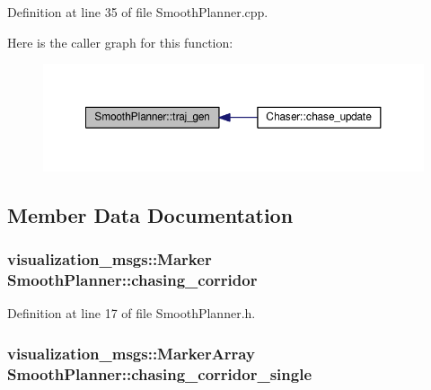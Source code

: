 Definition at line 35 of file Smooth\+Planner.\+cpp.



Here is the caller graph for this function\+:
\nopagebreak
\begin{figure}[H]
\begin{center}
\leavevmode
\includegraphics[width=350pt]{class_smooth_planner_afc03abbd5f6473f2bc952f70195326ac_icgraph}
\end{center}
\end{figure}




\subsection{Member Data Documentation}
\subsubsection[{\texorpdfstring{chasing\+\_\+corridor}{chasing_corridor}}]{\setlength{\rightskip}{0pt plus 5cm}visualization\+\_\+msgs\+::\+Marker Smooth\+Planner\+::chasing\+\_\+corridor}\hypertarget{class_smooth_planner_addf7aab458c1407f23e3544bd76ac82b}{}\label{class_smooth_planner_addf7aab458c1407f23e3544bd76ac82b}


Definition at line 17 of file Smooth\+Planner.\+h.

\subsubsection[{\texorpdfstring{chasing\+\_\+corridor\+\_\+single}{chasing_corridor_single}}]{\setlength{\rightskip}{0pt plus 5cm}visualization\+\_\+msgs\+::\+Marker\+Array Smooth\+Planner\+::chasing\+\_\+corridor\+\_\+single}\hypertarget{class_smooth_planner_acb1a985fe214b76a1a6d7462ad3ddf80}{}\label{class_smooth_planner_acb1a985fe214b76a1a6d7462ad3ddf80}


